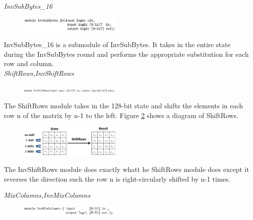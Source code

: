 \documentclass[journal, twocolumn, final,11pt,letterpaper]{IEEEtran}
\begin{document}
\textit{InvSubBytes\_16}\\
\vspace{-4mm}

\begin{figure}[h]
	\centering
	\includegraphics[width=0.45\textwidth]{InvSubBytes_16.jpg}
	\label{fig:InvSubBytes_16}
\end{figure}


InvSubBytes\_16 is a submodule of InvSubBytes.  It takes in the entire state during the InvSubBytes round and performs the appropriate substitution for each row and column. \\

\textit{ShiftRows,InvShiftRows}\\
\vspace{-4mm}

\begin{figure}[h]
	\centering
	\includegraphics[width=0.45\textwidth]{InvShiftRows.jpg}
	\label{fig:InvShiftRows}
\end{figure}

The ShiftRows module takes in the 128-bit state and shifts the elements in each row n of the matrix by n-1 to the left.  Figure \ref{fig:InvShiftRows} shows a diagram of ShiftRows. \\ 

\begin{figure}[h]
	\centering
	\includegraphics[width=0.45\textwidth]{ShiftRowsdia.jpg}
	\label{fig:ShiftRowsdia}
\end{figure}

The InvShiftRows module does exactly whatt he ShiftRows module does except it reverses the direction such the row n is right-circularly shifted by n-1 times. 

\textit{MixColumns,InvMixColumns}\\
\vspace{-4mm}

\begin{figure}[h]
	\centering
	\includegraphics[width=0.45\textwidth]{InvMixColumns.jpg}
	\label{fig:InvMixColumns}
\end{figure}
\end{document}
